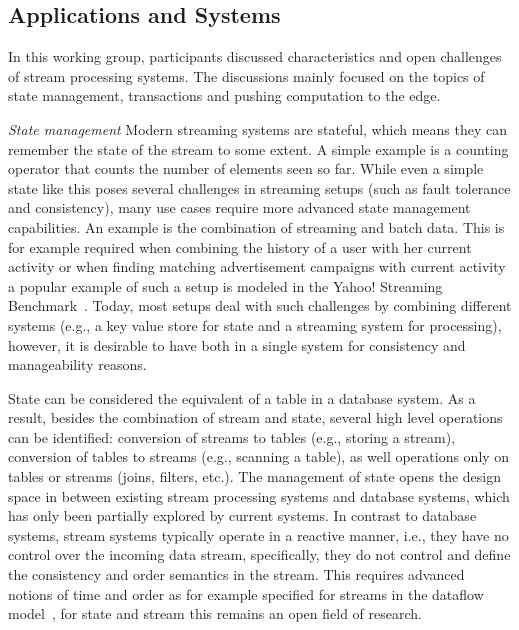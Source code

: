 \subsection{Applications and Systems}

In this working group, participants discussed characteristics and open
challenges of stream processing systems. The discussions mainly focused on
the topics of state management, transactions and pushing computation to the edge.

\emph{State management} Modern streaming systems are stateful, which means they can remember the state
of the stream to some extent. A simple example is a counting operator that
counts the number of elements seen so far. While even a simple state like this
poses several challenges in streaming setups (such as fault tolerance and
consistency), many use cases require more advanced state management
capabilities. An example is the combination of streaming and batch data. This
is for example required when combining the history of a user with her current
activity or when finding matching advertisement campaigns with current activity
a popular example of such a setup is modeled in the \textsf{Yahoo! Streaming
Benchmark}~\cite{Chintapalli2016BenchmarkingSC}. Today, most setups deal with
such challenges by combining different systems (e.g., a key value store for
state and a streaming system for processing), however, it is desirable to have
both in a single system for consistency and manageability reasons.

State can be considered the equivalent of a table in a database system. As a
result, besides the combination of stream and state, several high level
operations can be identified: conversion of streams to tables (e.g., storing
a stream), conversion of tables to streams (e.g., scanning a table), as well
operations only on tables or streams (joins, filters, etc.). The management of
state opens the design space in between existing stream processing systems and
database systems, which has only been partially explored by current systems.
In contrast to database systems, stream systems typically operate in a reactive
manner, i.e., they have no control over the incoming data stream, specifically,
they do not control and define the consistency and order semantics in the
stream. This requires advanced notions of time and order as for example
specified for streams in the dataflow model~\cite{akidau2015dataflow}, for state and stream
this remains an open field of research.


